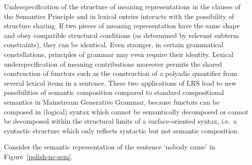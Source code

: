 \documentclass[output=paper
 	        ,biblatex
                ,babelshorthands
                ,newtxmath
                ,draftmode
                ,colorlinks, citecolor=brown
]{langscibook}
\begin{document}
Underspecification of the structure of meaning representations in the
clauses of the Semantics Principle and in lexical entries interacts
with the possibility of structure sharing. If two pieces of meaning
representation have the same shape and obey compatible structural
conditions (as determined by relevant subterm constraints), they can be
identical. Even stronger, in certain grammatical constellations,
principles of grammar may even require their
identity. Lexical underspecification of meaning contributions moreover
permits the shared construction of functors such as the construction
of a polyadic quantifier from several lexical items in a
sentence. These two applications of LRS lead to new possibilities
of semantic composition compared to standard compositional semantics
in Mainstream Generative Grammar, because functors can be composed in (logical) syntax
which cannot be semantically decomposed or cannot be decomposed within
the structural limits of a surface-oriented syntax, i.e.\ a syntactic
structure which only reflects syntactic but not semantic composition.





Consider the semantic representation of the  sentence  `nobody came' in Figure~\ref{polish-nc-sem}. 

\end{document}

